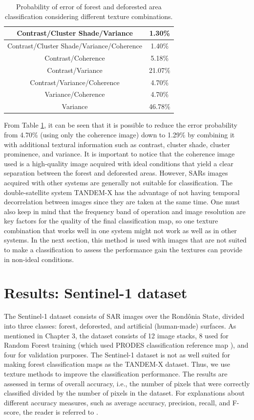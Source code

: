 \begin{table}[H]
\begin{tabular}{ |c |c |}
        Contrast/Cluster Shade/Variance & 1.30\% \\ \hline
        Contrast/Cluster Shade/Variance/Coherence & 1.40\% \\ \hline
        Contrast/Coherence & 5.18\% \\ \hline
        Contrast/Variance & 21.07\% \\ \hline
        Contrast/Variance/Coherence & 4.70\% \\ \hline
        Variance/Coherence & 4.70\% \\ \hline
        Variance & 46.78\% \\ \hline
    \end{tabular}
    \caption{Probability of error of forest and deforested area classification considering different texture combinations.}
    \label{tab:tandemx_results}
\end{table}

From Table \ref{tab:tandemx_results}, it can be seen that it is possible to reduce the error probability from 4.70\% (using only the coherence image) down to 1.29\% by combining it with additional textural information such as contrast, cluster shade, cluster prominence, and variance. It is important to notice that the coherence image used is a high-quality image acquired with ideal conditions that yield a clear separation between the forest and deforested areas. However, SARs images acquired with other systems are generally not suitable for classification. The double-satellite system TANDEM-X has the advantage of not having temporal decorrelation between images since they are taken at the same time. One must also keep in mind that the frequency band of operation and image resolution are key factors for the quality of the final classification map, so one texture combination that works well in one system might not work as well as in other systems. In the next section, this method is used with images that are not suited to make a classification to assess the performance gain the textures can provide in non-ideal conditions.

\section{Results: Sentinel-1 dataset}
The Sentinel-1 dataset consists of SAR images over the Rondônia State, divided into three classes: forest, deforested, and artificial (human-made) surfaces. As mentioned in Chapter 3, the dataset consists of 12 image stacks, 8 used for Random Forest training (which used PRODES classification reference map \cite{prodes}), and four for validation purposes. The Sentinel-1 dataset is not as well suited for making forest classification maps as the TANDEM-X dataset. Thus, we use texture methods to improve the classification performance. The results are assessed in terms of overall accuracy, i.e., the number of pixels that were correctly classified divided by the number of pixels in the dataset. For explanations about different accuracy measures, such as average accuracy, precision, recall, and F-score, the reader is referred to \cite{Book_ML}.

